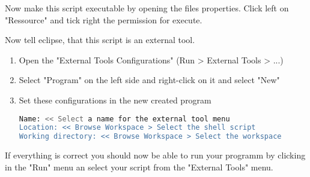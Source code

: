 Now make this script executable by opening the files properties.
Click left on "Ressource" and tick right the permission for execute.

Now tell eclipse, that this script is an external tool.

\begin{enumerate}
\item Open the "External Tools Configurations" (Run > External Tools > ...)
\item Select "Program" on the left side and right-click on it and select "New"
\item Set these configurations in the new created program
\begin{lstlisting}[language=bash]
Name: << Select a name for the external tool menu
Location: << Browse Workspace > Select the shell script
Working directory: << Browse Workspace > Select the workspace
\end{lstlisting}
\end{enumerate}

If everything is correct you should now be able to run your programm by clicking
in the "Run" menu an select your script from the "External Tools" menu.

